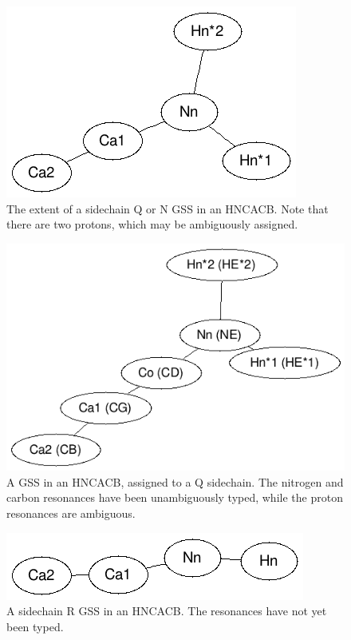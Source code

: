 \begin{figure}
  \includegraphics[scale=0.75]{figures/sidechain_qn_hncacb}
  \caption[The extent of a sidechain Q or N GSS in an HNCACB.]
          {The extent of a sidechain Q or N GSS in an HNCACB.  Note that
           there are two protons, which may be ambiguously assigned.}
  \label{sidechain_qn_hncacb}
\end{figure}

\begin{figure}
  \includegraphics[scale=0.75]{figures/sidechain_q_hncacb}
  \caption[A GSS in an HNCACB, assigned to a Q sidechain.]
          {A GSS in an HNCACB, assigned to a Q sidechain.
           The nitrogen and carbon resonances have been unambiguously
           typed, while the proton resonances are ambiguous.}
  \label{sidechain_q_hncacb}
\end{figure}

\begin{figure}
  \includegraphics[scale=0.75]{figures/sidechain_r_hncacb}
  \caption[A sidechain R gss in an HNCACB.]
          {A sidechain R GSS in an HNCACB.  The resonances have not
           yet been typed.}
  \label{sidechain_r_hncacb}
\end{figure}

